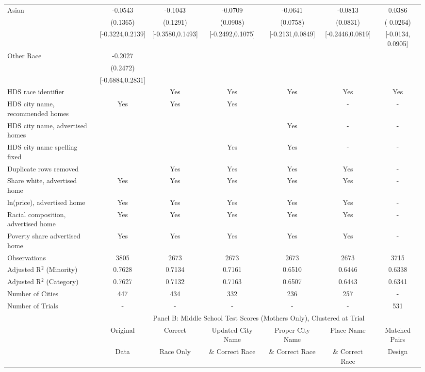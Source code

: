 \begin{table}[htbp]
{\begin{tabular}{l*{6}{c}}
Asian & -0.0543 & -0.1043 & -0.0709 & -0.0641 & -0.0813 & 0.0386 \\
 & (0.1365) & (0.1291) & (0.0908) & (0.0758) & (0.0831) & ( 0.0264) \\
 & [-0.3224,0.2139] & [-0.3580,0.1493] & [-0.2492,0.1075] & [-0.2131,0.0849] & [-0.2446,0.0819] & [-0.0134,  0.0905] \\
Other Race & -0.2027 &  &  &  &  &  \\
 & (0.2472) &  &  &  &  &  \\
 & [-0.6884,0.2831] &  &  &  &  &  \\
\midrule
HDS race identifier & & Yes & Yes & Yes & Yes & Yes \\
HDS city name, recommended homes & Yes & Yes & Yes & & - & -\\
HDS city name, advertised homes &  &  &  & Yes & - & -\\
HDS city name spelling fixed & & & Yes & Yes & - & -\\
Duplicate rows removed &  & Yes & Yes & Yes & Yes & - \\
\midrule
Share white, advertised home  & Yes & Yes & Yes & Yes & Yes & - \\
ln(price), advertised home  & Yes & Yes & Yes & Yes & Yes & - \\
Racial composition, advertised home & Yes & Yes & Yes & Yes & Yes & - \\
Poverty share advertised home & Yes & Yes & Yes & Yes & Yes & - \\
Observations & 3805 & 2673 & 2673 & 2673 & 2673 & 3715 \\
Adjusted R$^2$ (Minority) & 0.7628 & 0.7134 & 0.7161 & 0.6510 & 0.6446 & 0.6338 \\
Adjusted R$^2$ (Category) & 0.7627 & 0.7132 & 0.7163 & 0.6507 & 0.6443 & 0.6341 \\
Number of Cities & 447 & 434 & 332 & 236 & 257 & - \\
Number of Trials & - & - & - & - & - & 531 \\
\bottomrule
\toprule
& \multicolumn{6}{c}{Panel B: Middle School Test Scores (Mothers Only), Clustered at Trial}\\
\toprule
                    &\multicolumn{1}{c}{Original}&\multicolumn{1}{c}{Correct}&\multicolumn{1}{c}{Updated City Name}&\multicolumn{1}{c}{Proper City Name}&\multicolumn{1}{c}{Place Name}&\multicolumn{1}{c}{Matched Pairs}\\
                      &\multicolumn{1}{c}{Data}&\multicolumn{1}{c}{Race Only}&\multicolumn{1}{c}{\& Correct Race}&\multicolumn{1}{c}{\& Correct Race}&\multicolumn{1}{c}{\& Correct Race}&\multicolumn{1}{c}{Design}\\                  

\end{tabular}}
\end{table}
